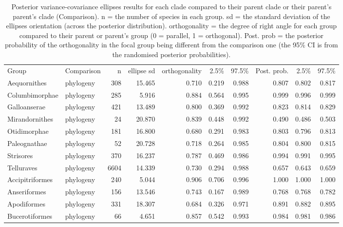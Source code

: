 \begin{longtable}{llrrrrrrrr}
\captionsetup{margin=-14pt}
\caption{Posterior variance-covariance ellipses results for each clade compared to their parent clade or their parent's parent's clade (Comparison). n = the number of species in each group. sd = the standard deviation of the ellipses orientation (across the posterior distribution). orthogonality = the degree of right angle for each group compared to their parent or parent's group (0 = parallel, 1 = orthogonal). Post. prob = the posterior probability of the orthogonality in the focal group being different from the comparison one (the 95\% CI is from the randomised posterior probabilities).} \\ 
  \hline
Group & Comparison & n & ellipse sd & orthogonality & 2.5\% & 97.5\% & Post. prob. & 2.5\% & 97.5\% \\ 
  \hline
Aequornithes & phylogeny &  308 & 15.465 & 0.710 & 0.219 & 0.988 & 0.807 & 0.802 & 0.817 \\ 
  Columbimorphae & phylogeny &  285 & 5.916 & 0.884 & 0.564 & 0.995 & 0.999 & 0.996 & 0.999 \\ 
  Galloanserae & phylogeny &  421 & 13.489 & 0.800 & 0.369 & 0.992 & 0.823 & 0.814 & 0.829 \\ 
  Mirandornithes & phylogeny &   24 & 20.870 & 0.839 & 0.448 & 0.992 & 0.490 & 0.486 & 0.503 \\ 
  Otidimorphae & phylogeny &  181 & 16.800 & 0.680 & 0.291 & 0.983 & 0.803 & 0.796 & 0.813 \\ 
  Paleognathae & phylogeny &   52 & 20.728 & 0.718 & 0.264 & 0.985 & 0.804 & 0.800 & 0.815 \\ 
  Strisores & phylogeny &  370 & 16.237 & 0.787 & 0.469 & 0.986 & 0.994 & 0.991 & 0.995 \\ 
  Telluraves & phylogeny & 6604 & 14.339 & 0.730 & 0.294 & 0.988 & 0.657 & 0.643 & 0.659 \\ 
  Accipitriformes & phylogeny &  240 & 5.044 & 0.906 & 0.706 & 0.996 & 1.000 & 1.000 & 1.000 \\ 
  Anseriformes & phylogeny &  156 & 13.546 & 0.743 & 0.167 & 0.989 & 0.768 & 0.768 & 0.782 \\ 
  Apodiformes & phylogeny &  331 & 18.307 & 0.684 & 0.326 & 0.971 & 0.891 & 0.882 & 0.895 \\ 
  Bucerotiformes & phylogeny &   66 & 4.651 & 0.857 & 0.542 & 0.993 & 0.984 & 0.981 & 0.986 \\ 

\end{longtable}
